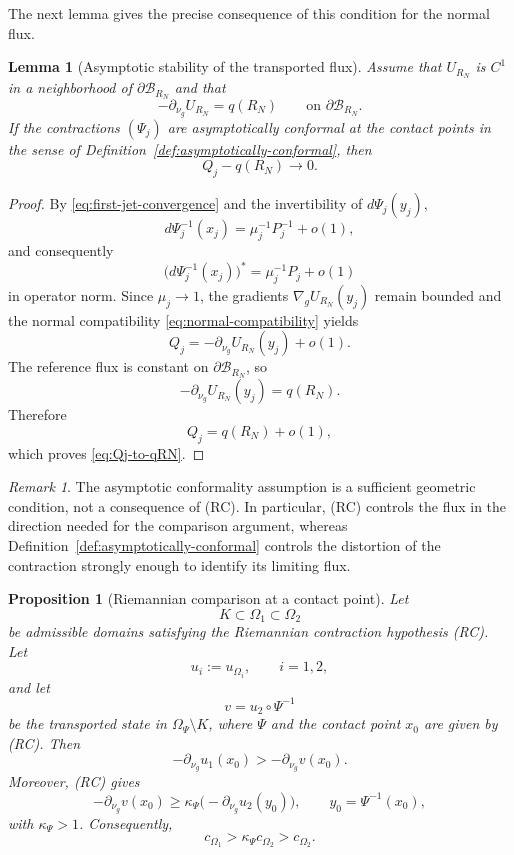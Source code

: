 \documentclass[11pt,a4paper]{article}
\newtheorem{proposition}[theorem]{Proposition}
\newtheorem{lemma}[theorem]{Lemma}
\theoremstyle{definition}
\theoremstyle{remark}
\newtheorem{remark}[theorem]{Remark}
\begin{document}
The next lemma gives the precise consequence of this condition for the
normal flux.

\begin{lemma}[Asymptotic stability of the transported flux]
\label{lem:asymptotic-flux-stability}
Assume that $U_{R_N}$ is $C^1$ in a neighborhood of
$\partial\mathcal B_{R_N}$ and that
\[
-\partial_{\nu_g}U_{R_N}=q(R_N)
\qquad\text{on }\partial\mathcal B_{R_N}.
\]
If the contractions $(\Psi_j)$ are asymptotically conformal at the
contact points in the sense of Definition~\ref{def:asymptotically-conformal},
then
\begin{equation}
Q_j-q(R_N)\longrightarrow0.
\label{eq:Qj-to-qRN}
\end{equation}
\end{lemma}

\begin{proof}
By \eqref{eq:first-jet-convergence} and the invertibility of
$d\Psi_j(y_j)$,
\[
d\Psi_j^{-1}(x_j)
=\mu_j^{-1}P_j^{-1}+o(1),
\]
and consequently
\[
\bigl(d\Psi_j^{-1}(x_j)\bigr)^*
=\mu_j^{-1}P_j+o(1)
\]
in operator norm. Since $\mu_j\to1$, the gradients
$\nabla_gU_{R_N}(y_j)$ remain bounded and the normal compatibility
\eqref{eq:normal-compatibility} yields
\[
Q_j
=
-\partial_{\nu_g}U_{R_N}(y_j)+o(1).
\]
The reference flux is constant on $\partial\mathcal B_{R_N}$, so
\[
-\partial_{\nu_g}U_{R_N}(y_j)=q(R_N).
\]
Therefore
\[
Q_j=q(R_N)+o(1),
\]
which proves \eqref{eq:Qj-to-qRN}.
\end{proof}

\begin{remark}
The asymptotic conformality assumption is a sufficient geometric
condition, not a consequence of (RC). In particular, (RC) controls the
flux in the direction needed for the comparison argument, whereas
Definition~\ref{def:asymptotically-conformal} controls the distortion of
the contraction strongly enough to identify its limiting flux.
\end{remark}


\begin{proposition}[Riemannian comparison at a contact point]
\label{prop:riemannian-contact-comparison}
Let
\[
K\subset\Omega_1\subset\Omega_2
\]
be admissible domains satisfying the Riemannian contraction hypothesis
{\rm (RC)}. Let
\[
u_i:=u_{\Omega_i},
\qquad i=1,2,
\]
and let
\[
v=u_2\circ\Psi^{-1}
\]
be the transported state in $\Omega_\Psi\setminus K$, where
$\Psi$ and the contact point $x_0$ are given by {\rm (RC)}. Then
\[
-\partial_{\nu_g}u_1(x_0)
>
-\partial_{\nu_g}v(x_0).
\label{eq:hopf-contact-comparison}
\]
Moreover, {\rm (RC)} gives
\[
-\partial_{\nu_g}v(x_0)
\geq
\kappa_\Psi
\bigl(-\partial_{\nu_g}u_2(y_0)\bigr),
\qquad
y_0=\Psi^{-1}(x_0),
\label{eq:RC-flux-comparison}
\]
with $\kappa_\Psi>1$. Consequently,
\begin{equation}
c_{\Omega_1}>\kappa_\Psi c_{\Omega_2}>c_{\Omega_2}.
\label{eq:riemannian-c-monotonicity}
\end{equation}
\end{proposition}
\end{document}
